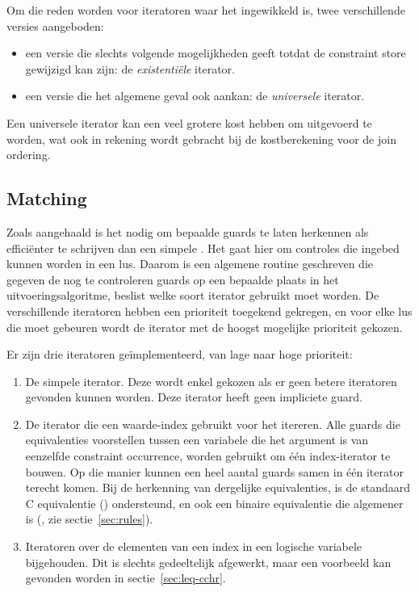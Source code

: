 Om die reden worden voor iteratoren waar het ingewikkeld is, twee verschillende versies aangeboden: \begin{itemize}
\item een versie die slechts volgende mogelijkheden geeft totdat de constraint store gewijzigd kan zijn: de {\em existenti\"ele} iterator.
\item een versie die het algemene geval ook aankan: de {\em universele} iterator.
\end{itemize}

Een universele iterator kan een veel grotere kost hebben om uitgevoerd te worden, wat ook in rekening wordt gebracht bij de kostberekening voor de join ordering.

\subsection{Matching} \label{sec:matching}

Zoals aangehaald is het nodig om bepaalde guards te laten herkennen als effici\"enter te schrijven dan een simpele . Het gaat hier om controles die ingebed kunnen worden in een lus. Daarom is een algemene routine geschreven die gegeven de nog te controleren guards op een bepaalde plaats in het uitvoeringsalgoritme, beslist welke soort iterator gebruikt moet worden. De verschillende iteratoren hebben een prioriteit toegekend gekregen, en voor elke lus die moet gebeuren wordt de iterator met de hoogst mogelijke prioriteit gekozen.

Er zijn drie iteratoren ge\"implementeerd, van lage naar hoge prioriteit: \begin{enumerate}
\item De simpele  iterator. Deze wordt enkel gekozen als er geen betere iteratoren gevonden kunnen worden. Deze iterator heeft geen impliciete guard.
\item De  iterator die een waarde-index gebruikt voor het itereren. Alle guards die equivalenties voorstellen tussen een variabele die het argument is van eenzelfde constraint occurrence, worden gebruikt om \'e\'en index-iterator te bouwen. Op die manier kunnen een heel aantal guards samen in \'e\'en iterator terecht komen. Bij de herkenning van dergelijke equivalenties, is de standaard C equivalentie (\code{==}) ondersteund, en ook een binaire equivalentie die algemener is (, zie sectie~\ref{sec:rules}).
\item Iteratoren over de elementen van een index in een logische variabele bijgehouden. Dit is slechts gedeeltelijk afgewerkt, maar een voorbeeld kan gevonden worden in sectie~\ref{sec:leq-cchr}.
\end{enumerate}

